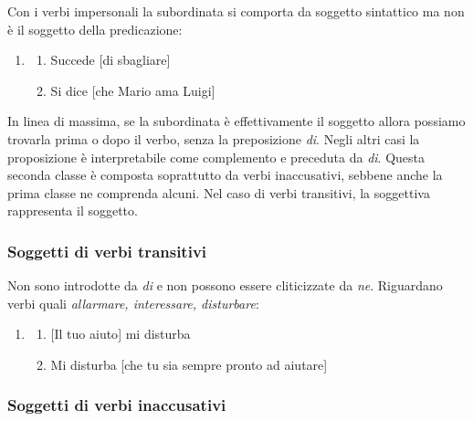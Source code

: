 \documentclass[
  a4paper,
  twoside,
  11pt,
  chapterprefix=false,
  bibliography=totocnumbered,
  listof=flat]{scrbook}
\providecommand{\tightlist}{%
  \setlength{\itemsep}{0pt}\setlength{\parskip}{0pt}}
\begin{document}
Con i verbi impersonali la subordinata si comporta da soggetto sintattico ma non è il soggetto della predicazione:

\begin{enumerate}
\def\labelenumi{(\arabic{enumi})}
\setcounter{enumi}{43}
\item
  \begin{enumerate}
  \def\labelenumii{\alph{enumii}.}
  \tightlist
  \item
    Succede {[}di sbagliare{]}
  \item
    Si dice {[}che Mario ama Luigi{]}
  \end{enumerate}
\end{enumerate}

In linea di massima, se la subordinata è effettivamente il soggetto allora possiamo trovarla prima o dopo il verbo, senza la preposizione \emph{di}.
Negli altri casi la proposizione è interpretabile come complemento e preceduta da \emph{di}.
Questa seconda classe è composta soprattutto da verbi inaccusativi, sebbene anche la prima classe ne comprenda alcuni. Nel caso di verbi transitivi, la soggettiva rappresenta il soggetto.

\hypertarget{soggetti-di-verbi-transitivi}{%
\subsubsection{Soggetti di verbi transitivi}\label{soggetti-di-verbi-transitivi}}

Non sono introdotte da \emph{di} e non possono essere cliticizzate da \emph{ne}. Riguardano verbi quali \emph{allarmare, interessare, disturbare}:

\begin{enumerate}
\def\labelenumi{(\arabic{enumi})}
\setcounter{enumi}{44}
\item
  \begin{enumerate}
  \def\labelenumii{\alph{enumii}.}
  \tightlist
  \item
    {[}Il tuo aiuto{]} mi disturba
  \item
    Mi disturba {[}che tu sia sempre pronto ad aiutare{]}
  \end{enumerate}
\end{enumerate}

\hypertarget{soggetti-di-verbi-inaccusativi}{%
\subsubsection{Soggetti di verbi inaccusativi}\label{soggetti-di-verbi-inaccusativi}}
\end{document}
